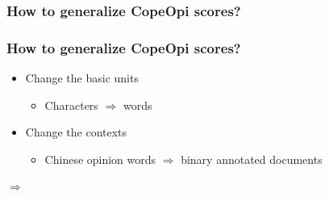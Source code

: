 \documentclass[mathserif]{beamer}
\begin{document}
\subsubsection{How to generalize CopeOpi scores?}
\begin{frame}
\frametitle{How to generalize CopeOpi scores?}
\begin{itemize}
\item Change the basic units
	\begin{itemize}
	\item Characters $\Rightarrow$ words
	\end{itemize}
\item Change the contexts\\
	\begin{itemize}
	\item Chinese opinion words $\Rightarrow$ binary annotated documents
	\end{itemize}
\end{itemize}
\begin{flushright}
$\Rightarrow$
\end{flushright}
\end{frame}
\end{document}
